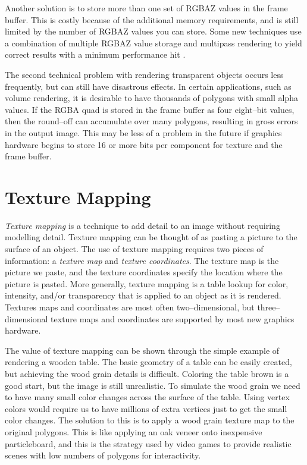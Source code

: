 Another solution is to store more than one set of RGBAZ values in the frame buffer. This is costly because of the additional memory requirements, and is still limited by the number of RGBAZ values you can store. Some new techniques use a combination of multiple RGBAZ value storage and multipass rendering to yield correct results with a minimum performance hit \cite{Hodges92}.

The second technical problem with rendering transparent objects occurs less frequently, but can still have disastrous effects. In certain applications, such as volume rendering, it is desirable to have thousands of polygons with small alpha values. If the RGBA quad is stored in the frame buffer as four eight--bit values, then the round--off can accumulate over many polygons, resulting in gross errors in the output image. This may be less of a problem in the future if graphics hardware begins to store 16 or more bits per component for texture and the frame buffer.

\section{Texture Mapping}

\emph{Texture mapping} is a technique to add detail to an image without requiring modelling detail. Texture mapping can be thought of as pasting a picture to the surface of an object. The use of texture mapping requires two pieces of information: a \emph{texture map} and \emph{texture coordinates}. The texture map is the picture we paste, and the texture coordinates specify the location where the picture is pasted. More generally, texture mapping is a table lookup for color, intensity, and/or transparency that is applied to an object as it is rendered. Textures maps and coordinates are most often two--dimensional, but three--dimensional texture maps and coordinates are supported by most new graphics hardware.

The value of texture mapping can be shown through the simple example of rendering a wooden table. The basic geometry of a table can be easily created, but achieving the wood grain details is difficult. Coloring the table brown is a good start, but the image is still unrealistic. To simulate the wood grain we need to have many small color changes across the surface of the table. Using vertex colors would require us to have millions of extra vertices just to get the small color changes. The solution to this is to apply a wood grain texture map to the original polygons. This is like applying an oak veneer onto inexpensive particleboard, and this is the strategy used by video games to provide realistic scenes with low numbers of polygons for interactivity.

